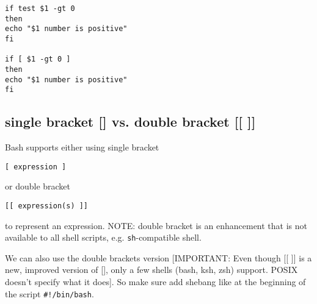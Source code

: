 \begin{verbatim}
if test $1 -gt 0
then
echo "$1 number is positive"
fi

if [ $1 -gt 0 ]
then
echo "$1 number is positive"
fi
\end{verbatim}


\subsection{single bracket [] vs. double bracket [[ ]]}
\label{sec:single-bracket}

Bash supports either using single bracket 
\begin{verbatim}
[ expression ]
\end{verbatim}
 or double bracket 
 \begin{verbatim}
[[ expression(s) ]]
 \end{verbatim}
to represent an expression. NOTE: double bracket is an enhancement that is not
available to all shell scripts, e.g. \verb!sh!-compatible shell. 

We can also use the double brackets version [IMPORTANT: Even though [[ ]] is a
new, improved version of [], only a few shells (bash, ksh, zsh) support. POSIX
doesn't specify what it does]. 
So make sure add shebang like at the beginning of the script 
\verb-#!/bin/bash-.

